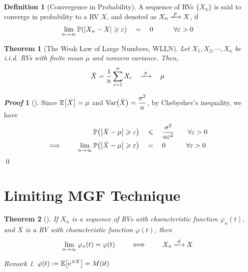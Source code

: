 \documentclass[10pt,UTF8]{article}
\newenvironment{definition box}
{\begin{tcolorbox}[colback=blue!5!white,colframe=blue!75!black,parbox=false,before upper=\par,before lower=\par]}
{\end{tcolorbox}}
\newenvironment{theorem box}
{\begin{tcolorbox}[colback=yellow!5!white,colframe=yellow!75!black,parbox=false,before upper=\par,before lower=\par]}
{\end{tcolorbox}}
\theoremstyle{definition}
\newtheorem{definition inner}{Definition}[section]
\newenvironment{definition}[1][]
{\begin{definition box}\begin{definition inner}[#1]\hfill\par}
{\end{definition inner}\end{definition box}}
\theoremstyle{plain}
\newtheorem{theorem inner}{Theorem}[section]
\newenvironment{theorem}[1][]
{\begin{theorem box}\begin{theorem inner}[#1]\hfill\par}
{\end{theorem inner}\end{theorem box}}
\theoremstyle{definition}
\newtheorem*{proof inner}{\textit{Proof}}
\renewenvironment{proof}[1][]
{\begin{proof inner}[#1]\hfill\par}
{\qed\end{proof inner}}
\theoremstyle{remark}
\newtheorem*{remark}{\textit{Remark}}
\newcommand{\e}{\mathrm{e}{\mkern 1 mu}}
\newcommand{\iu}{\mathrm{i}}
\newcommand{\E}[1]{\mathbb{E}\qty[#1]}  %
\newcommand{\Prob}{\mathbb{P}\qty}
\newcommand{\Var}{\mathrm{Var}\qty}  %
\begin{document}
\begin{definition}[Convergence in Probability]
    A sequence of RVs $\{X_n\}$ is said to converge in probability to a RV $X$,
    and denoted as $X_n \xlongrightarrow{p} X$, if
    \begin{equation*}
        \lim_{n\to\infty} \Prob(\abs{X_n - X} \geqslant \varepsilon) 
        \quad=\quad 0
        \qquad\quad \forall \varepsilon > 0
    \end{equation*}
\end{definition}

\begin{theorem}[The Weak Law of Large Numbers, WLLN]
    Let $X_1, X_2, \cdots, X_n$ be i.i.d. RVs with finite mean $\mu$
    and nonzero variance. Then,
    \begin{equation*}
        \bar{X} = \frac{1}{n}\sum_{i=1}^n X_i
        \quad\xlongrightarrow{p}\quad \mu
    \end{equation*}
\end{theorem}
\begin{proof}
    Since $\E{\bar{X}} = \mu$ and $\Var(\bar{X}) = \dfrac{\sigma^2}{n}$,
    by Chebyshev's inequality, we have
    \begin{align*}
        \Prob(\abs{\bar{X} - \mu} \geqslant \varepsilon) 
        \quad&\leqslant\quad \frac{\sigma^2}{n\varepsilon^2}
        \qquad \forall \varepsilon > 0 \\
        \implies \qquad
        \lim_{n\to\infty} \Prob(\abs{\bar{X} - \mu} \geqslant \varepsilon)
        \quad&=\quad 0
        \qquad\quad \forall \varepsilon > 0
    \end{align*}
\end{proof}


\section{Limiting MGF Technique}

\begin{theorem}
    If $X_n$ is a sequence of RVs with
    characteristic function $\varphi_{n}(t)$,
    and $X$ is a RV with characteristic function $\varphi(t)$,
    then
    \begin{equation*}
        \lim_{n\to\infty} \varphi_{n}(t) = \varphi(t)
        \qquad\iff\qquad
        X_n \xlongrightarrow{d} X
    \end{equation*}
\end{theorem}
\begin{remark}
    $\varphi(t) := \E{\e^{\iu t X}}
    = M(\iu t)$
\end{remark}
\end{document}
